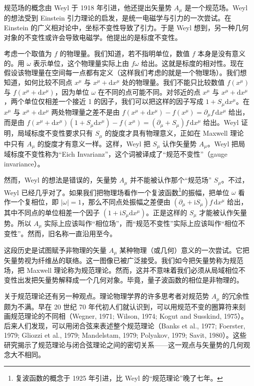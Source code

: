 规范场的概念由 Weyl 于 1918 年引进，他还提出矢量势 $A_\mu$ 是一个规范场。Weyl 的想法受到 Einstein 引力理论的启发，是统一电磁学与引力的一次尝试。在 Einstein 的广义相对论中，坐标不变性导致了引力。于是 Weyl 想到，另一种几何对象的不变性或许会导致电磁学。他提出的是标度不变性。

考虑一个取值为 $f$ 的物理量。我们知道，若不指明单位，数值 $f$ 本身是没有意义的。用 $\omega$ 表示单位，这个物理量实际上由 $f\omega$ 给出。这就是标度的相对性。现在假设该物理量在空间每一点都有定义（这样我们考虑的就是一个物理场）。我们想知道，如何比较不同点 $x^{\mu}$ 与 $x^{\mu}+\mathrm{d}x^{\mu}$ 处的物理量。我们不能只比较数值 $f(x^{\mu})$ 与 $f(x^{\mu}+\mathrm{d}x^{\mu})$，因为单位 $\omega$ 在不同的点可能不同。对邻近的点 $x^{\mu}$ 与 $x^{\mu}+\mathrm{d}x^{\mu}$，两个单位仅相差一个接近 1 的因子，我们可以把这样的因子写成 $1+S_\mu\mathrm{d}x^{\mu}$。在 $x^{\mu}$ 与 $x^{\mu}+\mathrm{d}x^{\mu}$ 两处物理量之差不是由 $f(x^{\mu}+\mathrm{d}x^{\mu})-f(x^{\mu})=\partial_\mu f\,\mathrm{d}x^{\mu}$ 给出，而是由 $f(x^{\mu}+\mathrm{d}x^{\mu})(1+S_\mu\mathrm{d}x^{\mu})-f(x^{\mu})=(\partial_\mu+S_\mu)f\,\mathrm{d}x^{\mu}$ 给出。Weyl 证明，局域标度不变性要求只有 $S_\mu$ 的旋度才具有物理意义，正如在 Maxwell 理论中只有 $A_\mu$ 的旋度才有意义一样。这样，Weyl 把 $S_\mu$ 认作矢量势 $A_\mu$。Weyl 把局域标度不变性称为“Eich Invarianz”，这个词被译成了“规范不变性”（gauge invariance）。

然而，Weyl 的想法是错误的，矢量势 $A_\mu$ 并不能被认作那个“规范场” $S_\mu$。不过，Weyl 已经几乎对了。如果我们把物理场看作一个复波函数\footnote{复波函数的概念于 1925 年引进，比 Weyl 的“规范理论”晚了七年。}的振幅，把单位 $\omega$ 看作一个复相位，即 $|\omega|=1$，那么不同点处振幅之差便由 $(\partial_\mu+\mathrm{i}S_\mu)f\,\mathrm{d}x^{\mu}$ 给出，其中不同点的单位相差一个因子 $(1+\mathrm{i}S_\mu\mathrm{d}x^{\mu})$。正是这样的 $S_\mu$ 才能被认作矢量势。所以 $A_\mu$ 实际上应该叫作“相位场”，而“规范不变性”实际上应该叫作“相位不变性”。然而，旧名称一直沿用至今。

这段历史是试图赋予非物理的矢量 $A_\mu$ 某种物理（或几何）意义的一次尝试。它把矢量势视为纤维丛的联络。这一图像已被广泛接受。我们如今把矢量势称为规范场，把 Maxwell 理论称为规范理论。然而，这并不意味着我们必须从局域相位不变性出发把矢量势解释成一个几何对象。毕竟，量子波函数的相位是非物理的。

关于规范理论还有另一种观点。理论物理学界的许多思考者对规范势 $A_\mu$ 的冗余性颇为不满。早在 20 世纪 70 年代初人们就认识到，可以用规范不变的圈算符来刻画规范理论的不同相（Wegner, 1971; Wilson, 1974; Kogut and Susskind, 1975）。后来人们发现，可以用闭合弦来表述整个规范理论（Banks et al., 1977; Foerster, 1979; Gliozzi et al., 1979; Mandelstam, 1979; Polyakov, 1979; Savit, 1980）。这些研究揭示了规范理论与闭合弦理论之间的密切关系——这一观点与矢量势的几何观念大不相同。

